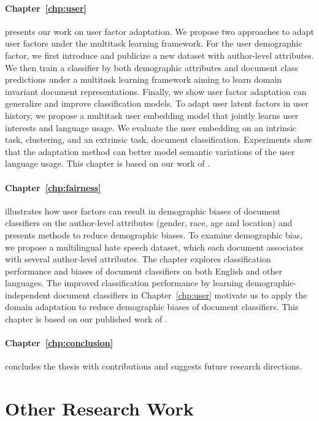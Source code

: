 \paragraph{Chapter~\ref{chp:user}} presents our work on user factor adaptation. We propose two approaches to adapt user factors under the multitask learning framework. For the user demographic factor, we first introduce and publicize a new dataset with author-level attributes. We then train a classifier by both demographic attributes and document class predictions under a multitask learning framework aiming to learn domain invariant document representations. Finally, we show user factor adaptation can generalize and improve classification models. To adapt user latent factors in user history, we propose a multitask user embedding model that jointly learns user interests and language usage. We evaluate the user embedding on an intrinsic task, clustering, and an extrinsic task, document classification. Experiments show that the adaptation method can better model semantic variations of the user language usage. This chapter is based on our work of \cite{huang2019neuraluser, huang2020user}.

\paragraph{Chapter~\ref{chp:fairness}} illustrates how user factors can result in demographic biases of document classifiers on the author-level attributes (gender, race, age and location) and presents methods to reduce demographic biases. 
To examine demographic bias, we propose a multilingual hate speech dataset, which each document associates with several author-level attributes. 
The chapter explores classification performance and biases of document classifiers on both English and other languages. 
The improved classification performance by learning demographic-independent document classifiers in Chapter~\ref{chp:user} motivate us to apply the domain adaptation to reduce demographic biases of document classifiers. 
This chapter is based on our published work of \cite{huang2020multilingual}.

\paragraph{Chapter~\ref{chp:conclusion}} concludes the thesis with contributions and suggests future research directions.

\section{Other Research Work}

